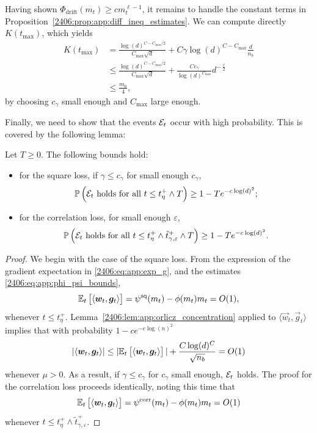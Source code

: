 Having shown $\Phi_{\mathrm{drift}}(m_t) \geq c m_t^{\ell-1}$, it remains to handle the constant terms in Proposition~\ref{2406:prop:app:diff_ineq_estimates}. We can compute directly $K(t_{\max})$, which yields
\begin{align*}
    K(t_{\max}) &= \frac{\log(d)^{C - C_{\max}/2}}{C_{\max}\sqrt{d}} + C\gamma\log(d)^{C - C_{\max}}\frac d{n_b} \\
    &\leq \frac{\log(d)^{C - C_{\max}/2}}{C_{\max}\sqrt{d}} + \frac{Cc_\gamma}{\log(d)^{C_{\max}}} d^{-\frac{\ell}{2}} \\
    &\leq \frac{m_0}{4},
\end{align*}
by choosing $c_\gamma$ small enough and $C_{\max}$ large enough.

Finally, we need to show that the events $\mathcal{E}_t$ occur with high probability. This is covered by the following lemma:
\begin{lemma}
    Let $T \geq 0$. The following bounds hold:
    \begin{itemize}
        \item for the square loss, if $\gamma \leq c_\gamma$ for small enough $c_\gamma$,
        \[ \mathbb{P}\left(\mathcal{E}_t \text{ holds for all } t \leq t_\eta^+ \wedge T \right) \geq 1 - Te^{-c\log(d)^2}; \]
        \item for the correlation loss, for small enough $\varepsilon$,
        \[ \mathbb{P}\left(\mathcal{E}_t \text{ holds for all } t \leq t_\eta^+ \wedge \tilde t_{\gamma, \varepsilon}^+ \wedge T \right) \geq 1 - Te^{-c\log(d)^2}. \]
    \end{itemize}
\end{lemma}

\begin{proof}
    We begin with the case of the square loss. From the expression of the gradient expectation in \eqref{2406:eq:app:exp_g}, and the estimates \eqref{2406:eq:app:phi_psi_bounds},
    \[ \mathbb{E}_t\left[\langle {\boldsymbol{w}}_t, {\boldsymbol{g}}_t \rangle\right] = \psi^{\mathrm{sq}}(m_t) - \phi(m_t)m_t = O(1),\]
    whenever $t \leq t_\eta^+$. Lemma~\ref{2406:lem:app:orlicz_concentration} applied to $\langle \vec{w}_t, \vec{g}_t \rangle$ implies that with probability $1 - ce^{-c\log(n)^2}$
    \[ |\langle {\boldsymbol{w}}_t, {\boldsymbol{g}}_t \rangle| \leq |\mathbb{E}_t\left[\langle {\boldsymbol{w}}_t, {\boldsymbol{g}}_t \rangle\right]| +\frac{C\log(d)^C}{\sqrt{n_b}} = O(1) \]
    whenever $\mu > 0$. As a result, if $\gamma \leq c_\gamma$ for $c_\gamma$ small enough, $\mathcal{E}_t$ holds. The proof for the correlation loss proceeds identically, noting this time that
    \[ \mathbb{E}_t\left[\langle {\boldsymbol{w}}_t, {\boldsymbol{g}}_t \rangle\right] = \psi^{\mathrm{corr}}(m_t) - \phi(m_t)m_t = O(1) \]
    whenever $t \leq t_\eta^+ \wedge \tilde t_{\gamma, \varepsilon}^+$.
\end{proof}

